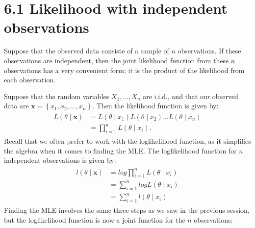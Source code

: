 \documentclass[letterpaper,10pt,english]{jupyterBook}
\begin{document}
\section{6.1 Likelihood with independent observations}
\label{\detokenize{06.b. Maximum Likelihood:likelihood-with-independent-observations}}\label{\detokenize{06.b. Maximum Likelihood::doc}}
\sphinxAtStartPar
Suppose that the observed data consiste of a sample of \(n\) observations. If these observations are independent, then the joint likelihood function from these \(n\) observations has a very convenient form; it is the product of the likelihood from each observation.

\sphinxAtStartPar
Suppose that the random variables \(X_1,..., X_n\) are i.i.d., and that our observed data are \(\mathbf{x} = \left\{ x_1, x_2, ..., x_n \right\}\). Then the likelihood function is given by:
\begin{equation*}
\begin{split}
\begin{align*}
L \left( \theta \mid \mathbf{x} \right) &=  L\left( \theta \mid x_1 \right) L\left( \theta \mid x_2 \right) ...  L \left( \theta \mid x_n \right) \\
 &= \prod_{i=1}^n  L\left( \theta \mid x_i \right).
\end{align*}
\end{split}
\end{equation*}
\sphinxAtStartPar
Recall that we often prefer to work with the log\sphinxhyphen{}likelihood function, as it simplifies the algebra when it comes to finding the MLE. The log\sphinxhyphen{}likelihood function for \(n\) independent observations is given by:
\begin{equation*}
\begin{split}
\begin{align*}
l \left( \theta \mid \mathbf{x} \right) 
 &= log \prod_{i=1}^n L\left( \theta \mid x_i \right) \\
  &= \sum_{i=1}^n log L\left( \theta \mid x_i \right) \\
   &= \sum_{i=1}^n l\left( \theta \mid x_i \right) 
\end{align*}
\end{split}
\end{equation*}
\sphinxAtStartPar
Finding the MLE involves the same three steps as we saw in the previous session, but the log\sphinxhyphen{}likelihood function is now a joint function for the \(n\) observations:
\end{document}
